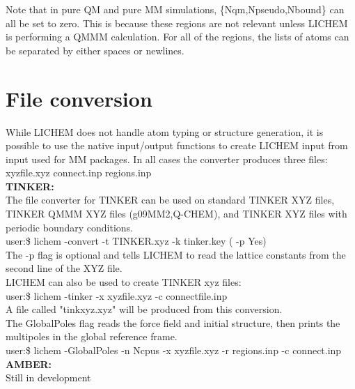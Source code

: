 \documentclass[12pt]{report}
\begin{document}
Note that in pure QM and pure MM simulations, \{Nqm,Npseudo,Nbound\} can all
be set to zero.
This is because these regions are not relevant unless LICHEM is performing a
QMMM calculation.
For all of the regions, the lists of atoms can be separated by either spaces
or newlines.

\section{File conversion}

While LICHEM does not handle atom typing or structure generation, it is
possible to use the native input/output functions to create LICHEM input from
input used for MM packages.
In all cases the converter produces three files: xyzfile.xyz connect.inp
regions.inp \\

{\textbf{TINKER:}} \\

The file converter for TINKER can be used on standard TINKER XYZ files,
TINKER QMMM XYZ files (g09MM2,Q-CHEM), and TINKER XYZ files with periodic
boundary conditions. \\

user:\$ lichem -convert -t TINKER.xyz -k tinker.key ( -p Yes) \\

The -p flag is optional and tells LICHEM to read the lattice constants from
the second line of the XYZ file. \\

LICHEM can also be used to create TINKER xyz files: \\

user:\$ lichem -tinker -x xyzfile.xyz -c connectfile.inp \\

A file called "tinkxyz.xyz" will be produced from this conversion. \\

The GlobalPoles flag reads the force field and initial structure, then prints
the multipoles in the global reference frame. \\

user:\$ lichem -GlobalPoles -n Ncpus -x xyzfile.xyz -r regions.inp
 -c connect.inp \\

{\textbf{AMBER:}} \\

{\color{red}Still in development} \\
\end{document}
